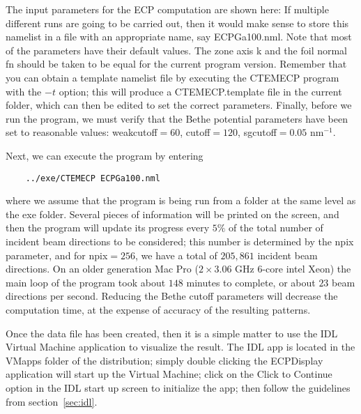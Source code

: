 \documentclass[DIV=calc, paper=letter, fontsize=11pt]{scrartcl}	 %
\begin{document}
The input parameters for the ECP computation are shown here:
If multiple different runs are going to be carried out, then it would make sense to store this namelist in a 
file with an appropriate name, say \textsf{ECPGa100.nml}.  Note that most of the parameters have their default values.  The
zone axis \textsf{k} and the foil normal \textsf{fn} should be taken to be equal for the current program version.
Remember that you can obtain a template namelist file by executing the \textsf{CTEMECP} program with the $-t$ option; 
this will produce a \textsf{CTEMECP.template} file in the current folder, which can then be edited to set the correct
parameters. Finally, before we run the program, we must verify that the Bethe potential parameters have been set to reasonable values:
\textsf{weakcutoff}$= 60$, \textsf{cutoff}$= 120$, \textsf{sgcutoff}$=0.05$ nm$^{-1}$.

Next, we can execute the program by entering
\begin{verbatim}
	../exe/CTEMECP ECPGa100.nml
\end{verbatim}
where we assume that the program is being run from a folder at the same level as the exe folder.  Several pieces of
information will be printed on the screen, and then the program will update its progress every $5\%$ of the total number
of incident beam directions to be considered; this number is determined by the \textsf{npix} parameter, and for 
\textsf{npix}$=256$, we have a total of $205,861$ incident beam directions.
On an older generation Mac Pro ($2\times 3.06$ GHz $6$-core intel Xeon) the main loop of the program took about $148$ minutes
to complete, or about $23$ beam directions per second.  Reducing the Bethe cutoff parameters will decrease the computation time,
at the expense of accuracy of the resulting patterns.

Once the data file has been created, then it is a simple matter to use the IDL Virtual Machine application to 
visualize the result.   The IDL app is located in the VMapps folder of the distribution; simply double clicking the \textsf{ECPDisplay}
application will start up the Virtual Machine; click on the \textsf{Click to Continue} option in the IDL start up screen to 
initialize the app; then follow the guidelines from section~\ref{sec:idl}.

\begin{refsection}[papers]
\nocite{degraef2003b,humphreys1979a,winkelmann2003a,winkelmann2008a,weickenmeier1991a,reimer1985a}%
  \printbibliography[title={References}]
\end{refsection}
\end{document}

